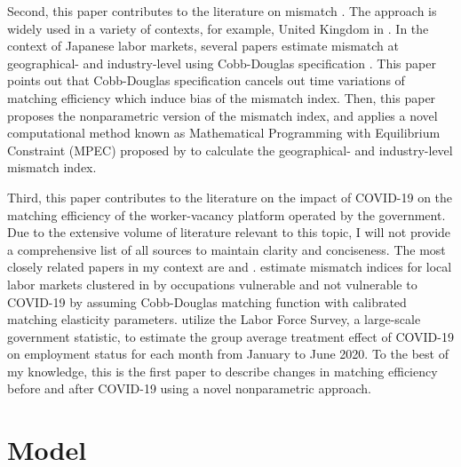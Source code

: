 \documentclass[12pt]{article}
\begin{document}
Second, this paper contributes to the literature on mismatch \cite{csahin2014mismatch}. 
The approach is widely used in a variety of contexts, for example, United Kingdom in \cite{patterson2016working}.
In the context of Japanese labor markets, several papers estimate mismatch at geographical- and industry-level using Cobb-Douglas specification \citep{shibata2013labor,shibata2020labor,kawata2016multi,higashi2018spatial,kawata2019,higashi2020effects,higashi2021agglomeration,higashi2023did}. 
This paper points out that Cobb-Douglas specification cancels out time variations of matching efficiency which induce bias of the mismatch index. Then, this paper proposes the nonparametric version of the mismatch index, and applies a novel computational method known as Mathematical Programming with Equilibrium Constraint (MPEC) proposed by \cite{su2012constrained,dube2012improving} to calculate the geographical- and industry-level mismatch index.


Third, this paper contributes to the literature on the impact of COVID-19 on the matching efficiency of the worker-vacancy platform operated by the government. 
Due to the extensive volume of literature relevant to this topic, I will not provide a comprehensive list of all sources to maintain clarity and conciseness. 
The most closely related papers in my context are \cite{higashi2023did} and \cite{fukai2021describing}. 
\cite{higashi2023did} estimate mismatch indices for local labor markets clustered in by occupations vulnerable and not vulnerable to COVID-19 by assuming Cobb-Douglas matching function with calibrated matching elasticity parameters.
\cite{fukai2021describing} utilize the Labor Force Survey, a large-scale government statistic, to estimate the group average treatment effect of COVID-19 on employment status for each month from January to June 2020. 
To the best of my knowledge, this is the first paper to describe changes in matching efficiency before and after COVID-19 using a novel nonparametric approach.




\section{Model}
\end{document}
